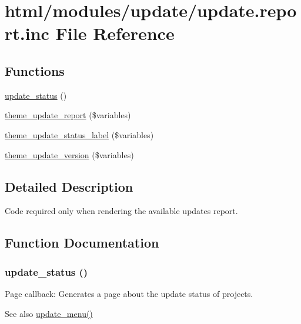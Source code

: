 \hypertarget{update_8report_8inc}{
\section{html/modules/update/update.report.inc File Reference}
\label{update_8report_8inc}
}
\subsection*{Functions}
\begin{DoxyCompactItemize}
\item 
\hyperlink{update_8report_8inc_a287045a3ba0dff30d7f84cd7a5a8e8ed}{update\_\-status} ()
\item 
\hyperlink{group__themeable_gab9223d8dc740de3fd1b9fd98c819e438}{theme\_\-update\_\-report} (\$variables)
\item 
\hyperlink{group__themeable_ga0207c01d37d3cb060dabc28b55db5285}{theme\_\-update\_\-status\_\-label} (\$variables)
\item 
\hyperlink{group__themeable_ga04407a35c1e7805fa3db729df5857903}{theme\_\-update\_\-version} (\$variables)
\end{DoxyCompactItemize}


\subsection{Detailed Description}
Code required only when rendering the available updates report. 

\subsection{Function Documentation}
\hypertarget{update_8report_8inc_a287045a3ba0dff30d7f84cd7a5a8e8ed}{
\subsubsection[{update\_\-status}]{\setlength{\rightskip}{0pt plus 5cm}update\_\-status ()}}
\label{update_8report_8inc_a287045a3ba0dff30d7f84cd7a5a8e8ed}
Page callback: Generates a page about the update status of projects.

\begin{DoxySeeAlso}{See also}
\hyperlink{update_8module_abfea1a759334c0461fa9ff2250bdfaaf}{update\_\-menu()} 
\end{DoxySeeAlso}
